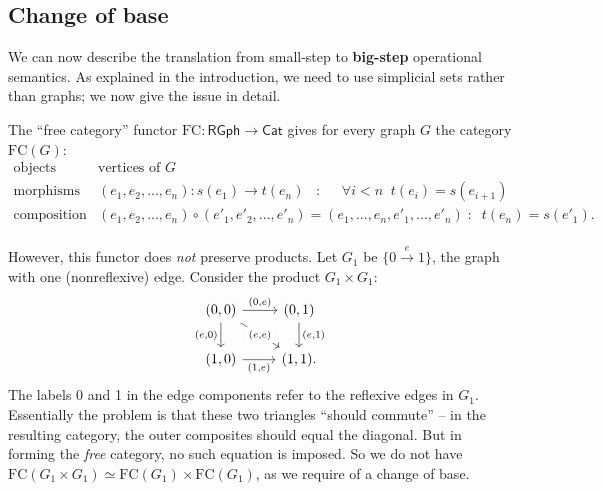 \documentclass{amsart}
\theoremstyle{definition}
\newcommand{\sSet}{\mathsf{sSet}}
\newcommand{\RGph}{\mathsf{RGph}}
\newcommand{\Cat}{\mathsf{Cat}}
\newcommand{\FC}{\mathrm{FC}}
\newcommand{\maps}{\colon}
\begin{document}

\subsection{Change of base}

We can now describe the translation from small-step to \textbf{big-step} operational semantics. As explained in the introduction, we need to use simplicial sets rather than graphs; we now give the issue in detail.


The ``free category'' functor $\FC\maps \RGph \to \Cat$ gives for every graph $G$ the category $\FC(G)$: %
\[\begin{array}{rl}
\text{objects} & \text{vertices of } G\\
\text{morphisms} & (e_1,e_2,...,e_n)\maps s(e_1)\to t(e_n) \;\; \; : \;\;\; \;\; \forall i<n \;\; t(e_i)=s(e_{i+1})\\
\text{composition} & (e_1,e_2,...,e_n) \circ (e'_1,e'_2,...,e'_n) = (e_1,...,e_n,e'_1,...,e'_n) \; : \;\; t(e_n)=s(e'_1).\\
  \end{array}\]

However, this functor does \emph{not} preserve products. Let $G_1$ be $\{0\xrightarrow{e} 1\}$, the graph with one (nonreflexive) edge. Consider the product $G_1\times G_1$:
\[\begin{tikzcd}
    (0,0) \arrow[r,"(0{,}e)"] \ar[d,"(e{,}0)",swap] \ar[dr,"(e{,}e)" description] & (0,1) \ar[d,"(e{,}1)"]\\
    (1,0) \ar[r,"(1{,}e)",swap] & (1,1).
  \end{tikzcd}\]
The labels 0 and 1 in the edge components refer to the reflexive edges in $G_1$. Essentially the problem is that these two triangles ``should commute'' -- in the resulting category, the outer composites should equal the diagonal. But in forming the \emph{free} category, no such equation is imposed. So we do not have $\FC(G_1\times G_1) \simeq \FC(G_1)\times \FC(G_1)$, as we require of a change of base.
\end{document}
